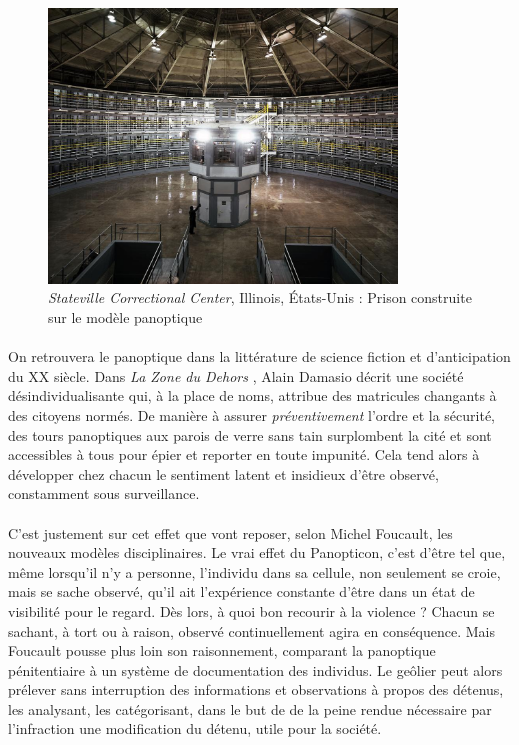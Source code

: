 \begin{figure}[h]
    \centering
    \includegraphics[width=350px]{chapters/01/images/panoptique.jpg}
    \caption{\label{panoptique} \emph{Stateville Correctional Center}, Illinois, États-Unis : Prison construite sur le modèle panoptique}
\end{figure}

\paragraph{} On retrouvera le panoptique dans la littérature de science fiction et d'anticipation du XX siècle.
Dans \emph{La Zone du Dehors} \cite{Damasio0}, Alain Damasio décrit une société désindividualisante qui, à la place
de noms, attribue des matricules changants à des citoyens normés. De manière à assurer \emph{préventivement} l'ordre et la
sécurité, des tours panoptiques aux parois de verre sans tain surplombent la cité et sont accessibles à tous pour épier
et reporter en toute impunité. Cela tend alors à développer chez chacun le sentiment latent et insidieux d'être observé, 
constamment sous surveillance.

\paragraph{} C'est justement sur cet effet que vont reposer, selon Michel Foucault, les nouveaux modèles disciplinaires.
\guillemotleft Le vrai effet du Panopticon, c'est d'être tel que, même lorsqu'il n'y a personne, l'individu dans sa
cellule, non seulement se croie, mais se sache observé, qu'il ait l'expérience constante d'être dans un état de visibilité
pour le regard.\guillemotright \cite{Foucault0} Dès lors, à quoi bon recourir à la violence ? Chacun se sachant, à tort
ou à raison, observé continuellement agira en conséquence. Mais Foucault pousse plus loin son raisonnement, comparant la
panoptique pénitentiaire à un système de documentation des individus. Le geôlier peut alors prélever sans interruption
des informations et observations à propos des détenus, les analysant, les catégorisant, dans le but de \guillemotleft 
[Faire] de la peine rendue nécessaire par l'infraction une modification du détenu, utile pour la société.\guillemotright

